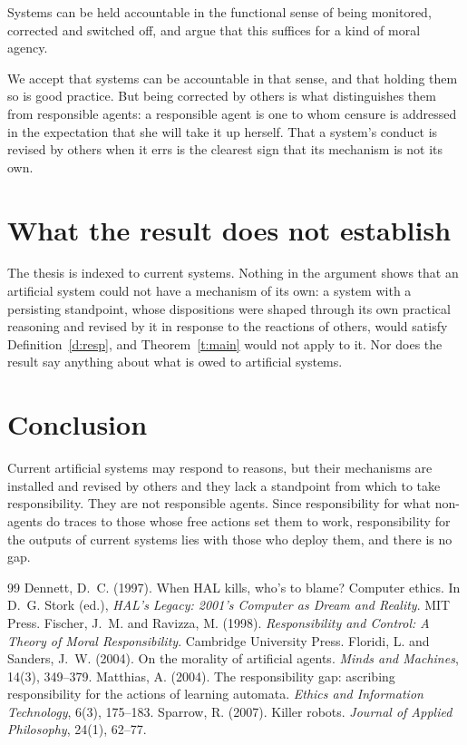\documentclass{situationist-preprint}
\begin{document}
\begin{objection}
Systems can be held accountable in the functional sense of being monitored, corrected and switched off, and \citet{FloridiSanders2004} argue that this suffices for a kind of moral agency.
\end{objection}

\begin{reply}
We accept that systems can be accountable in that sense, and that holding them so is good practice. But being corrected by others is what distinguishes them from responsible agents: a responsible agent is one to whom censure is addressed in the expectation that she will take it up herself. That a system's conduct is revised by others when it errs is the clearest sign that its mechanism is not its own.
\end{reply}

\section{What the result does not establish}

The thesis is indexed to current systems. Nothing in the argument shows that an artificial system could not have a mechanism of its own: a system with a persisting standpoint, whose dispositions were shaped through its own practical reasoning and revised by it in response to the reactions of others, would satisfy Definition~\ref{d:resp}, and Theorem~\ref{t:main} would not apply to it. Nor does the result say anything about what is owed to artificial systems.

\section{Conclusion}

Current artificial systems may respond to reasons, but their mechanisms are installed and revised by others and they lack a standpoint from which to take responsibility. They are not responsible agents. Since responsibility for what non-agents do traces to those whose free actions set them to work, responsibility for the outputs of current systems lies with those who deploy them, and there is no gap.

\begin{thebibliography}{99}\small
{} Dennett, D.~C. (1997). When HAL kills, who's to blame? Computer ethics. In D.~G. Stork (ed.), \emph{HAL's Legacy: 2001's Computer as Dream and Reality}. MIT Press.
 Fischer, J.~M. and Ravizza, M. (1998). \emph{Responsibility and Control: A Theory of Moral Responsibility}. Cambridge University Press.
 Floridi, L. and Sanders, J.~W. (2004). On the morality of artificial agents. \emph{Minds and Machines}, 14(3), 349--379.
 Matthias, A. (2004). The responsibility gap: ascribing responsibility for the actions of learning automata. \emph{Ethics and Information Technology}, 6(3), 175--183.
 Sparrow, R. (2007). Killer robots. \emph{Journal of Applied Philosophy}, 24(1), 62--77.
\end{thebibliography}
\end{document}
